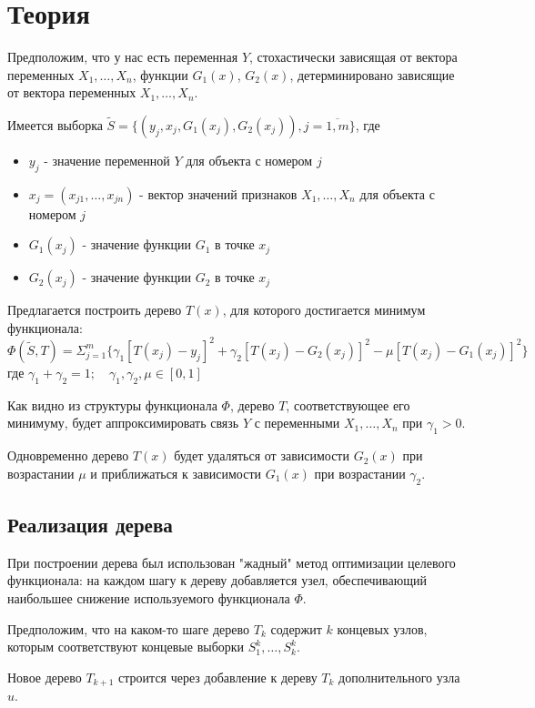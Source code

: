 \documentclass{article}
\begin{document}
\section{Теория}

Предположим, что у нас есть переменная $Y$, стохастически зависящая от вектора переменных $X_1, \dots, X_n$, 
функции $G_1(x)$, $G_2(x)$, детерминировано зависящие от вектора переменных $X_1, \dots, X_n$.

Имеется выборка $\tilde{S} = \{ (y_j, x_j, G_1(x_j), G_2(x_j)), j = \overline{1, m} \}$, где
\begin{itemize}
	\item $y_j$ - значение переменной $Y$ для объекта с номером $j$
	\item $x_j = (x_{j1}, \dots, x_{jn})$ - вектор значений признаков $X_1, \dots, X_n$ для объекта с номером $j$
	\item $G_1(x_j)$ - значение функции $G_1$ в точке $x_j$
	\item $G_2(x_j)$ - значение функции $G_2$ в точке $x_j$
\end{itemize}

Предлагается построить дерево $T(x)$, для которого достигается минимум функционала:
$$ \Phi(\tilde{S}, T) = \Sigma_{j=1}^{m} \{ \gamma_1 [T(x_j) - y_j]^2 + \gamma_2 [T(x_j) - G_2(x_j)]^2 - \mu [T(x_j) - G_1(x_j)]^2   \}  $$
где $\gamma_1 + \gamma_2 = 1; \quad \gamma_1, \gamma_2, \mu \in [0, 1] $


Как видно из структуры функционала $\Phi$, дерево $T$, соответствующее его минимуму,  будет аппроксимировать связь $Y$ с переменными $X_1, \dots, X_n$ при $\gamma_1 > 0$.

Одновременно дерево $T(x)$ будет удаляться от зависимости $G_2(x)$ при возрастании $\mu$ и приближаться к зависимости $G_1(x)$ при возрастании $\gamma_2$.


\subsection{Реализация дерева}

При построении дерева был использован "жадный" \space метод оптимизации целевого функционала: на каждом шагу к дереву добавляется узел, обеспечивающий наибольшее снижение используемого функционала $\Phi$.

Предположим, что на каком-то шаге дерево $T_k$ содержит $k$ концевых узлов, которым соответствуют концевые выборки $S_1^k, \dots, S_k^k$.

Новое дерево $T_{k + 1}$ строится через добавление к дереву $T_k$ дополнительного узла $u$.
\end{document}
